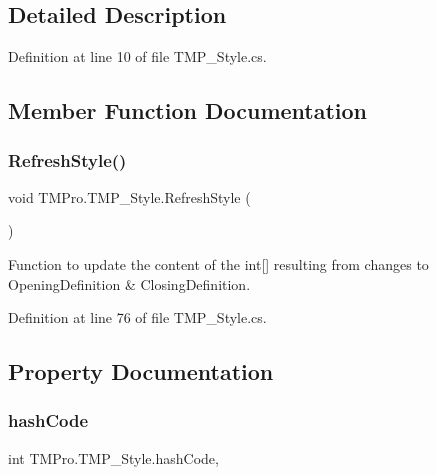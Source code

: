\subsection{Detailed Description}


Definition at line 10 of file T\+M\+P\+\_\+\+Style.\+cs.



\subsection{Member Function Documentation}
\mbox{\label{class_t_m_pro_1_1_t_m_p___style_a45cd2cf30f163d32c1bfa91914852154}} 
\subsubsection{\texorpdfstring{RefreshStyle()}{RefreshStyle()}}
{\footnotesize\ttfamily void T\+M\+Pro.\+T\+M\+P\+\_\+\+Style.\+Refresh\+Style (\begin{DoxyParamCaption}{ }\end{DoxyParamCaption})}



Function to update the content of the int\mbox{[}\mbox{]} resulting from changes to Opening\+Definition \& Closing\+Definition. 



Definition at line 76 of file T\+M\+P\+\_\+\+Style.\+cs.



\subsection{Property Documentation}
\mbox{\label{class_t_m_pro_1_1_t_m_p___style_a6459a59ebf00adf6722b35a1331ee57a}} 
\subsubsection{\texorpdfstring{hashCode}{hashCode}}
{\footnotesize\ttfamily int T\+M\+Pro.\+T\+M\+P\+\_\+\+Style.\+hash\+Code\hspace{0.3cm}{\ttfamily [get]}, {\ttfamily [set]}}



